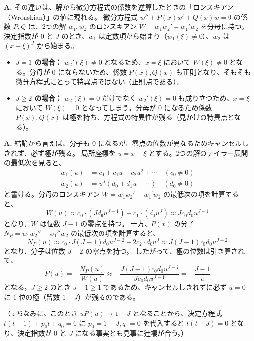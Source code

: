 \begin{Q}[【核心】$J=1$ と $J \ge 2$ では、どちらも「2つの解が正則」になるのに、なぜ $J=1$ は「正則点」で、$J \ge 2$ は「見かけの特異点」になるのか？]
\textbf{A.} その違いは、解から微分方程式の係数を逆算したときの「ロンスキアン（Wronskian）」の値に現れる。
微分方程式 $w'' + P(x)w' + Q(x)w = 0$ の係数 $P, Q$ は、2つの解 $w_{1}, w_{2}$ のロンスキアン $W = w_{1}w_{2}' - w_{1}'w_{2}$ を分母に持つ。
決定指数が $0$ と $J$ のとき、$w_{1}$ は定数項から始まり（$w_{1}(\xi) \neq 0$）、$w_{2}$ は $(x-\xi)^{J}$ から始まる。
\begin{itemize}
    \item \textbf{$J=1$ の場合：} $w_{2}'(\xi) \neq 0$ となるため、$x=\xi$ において $W(\xi) \neq 0$ となる。分母が $0$ にならないため、係数 $P(x), Q(x)$ も正則となり、そもそも微分方程式にとって特異点ではない（正則点である）。
    \item \textbf{$J \ge 2$ の場合：} $w_{2}(\xi) = 0$ だけでなく $w_{2}'(\xi) = 0$ も成り立つため、$x=\xi$ において $W(\xi) = 0$ となってしまう。分母が $0$ になるため係数 $P(x), Q(x)$ は極を持ち、方程式の特異性が残る（見かけの特異点となる）。
\end{itemize}
\end{Q}

\begin{Q}[【核心】$W(\xi)=0$ になるとしても、$P(x) = -\frac{w_{1}w_{2}'' - w_{1}''w_{2}}{W}$ の分子も同時に $0$ になって、極がキャンセルされる（除去可能な特異点になる）可能性はないのか？]
\textbf{A.} 結論から言えば、分子も $0$ になるが、零点の位数が異なるためキャンセルしきれず、必ず極が残る。
局所座標を $u = x-\xi$ とする。2つの解のテイラー展開の最低次を見ると、
\begin{align*}
w_{1}(u) &= c_{0} + c_{1}u + c_{2}u^{2} + \cdots \quad (c_{0} \neq 0) \\
w_{2}(u) &= u^{J}(d_{0} + d_{1}u + \cdots) \quad (d_{0} \neq 0)
\end{align*}
と書ける。分母のロンスキアン $W = w_{1}w_{2}' - w_{1}'w_{2}$ の最低次の項を計算すると、
\[
W(u) \approx c_{0} \cdot (J d_{0} u^{J-1}) - c_{1} \cdot (d_{0} u^{J}) \approx J c_{0} d_{0} u^{J-1}
\]
となり、$W$ は位数 $J-1$ の零点を持つ。
一方、$P(x)$ の分子 $N_{P} = w_{1}w_{2}'' - w_{1}''w_{2}$ の最低次の項を計算すると、
\[
N_{P}(u) \approx c_{0} \cdot J(J-1)d_{0}u^{J-2} - 2c_{2} \cdot d_{0}u^{J} \approx J(J-1)c_{0}d_{0}u^{J-2}
\]
となり、分子は位数 $J-2$ の零点を持つ。
したがって、極の位数は引き算されて、
\[
P(u) = -\frac{N_{P}(u)}{W(u)} \approx -\frac{J(J-1)c_{0}d_{0}u^{J-2}}{J c_{0} d_{0} u^{J-1}} = -\frac{J-1}{u}
\]
となる。$J \ge 2$ のとき $J-1 \ge 1$ であるため、キャンセルしきれずに必ず $u=0$ に $1$ 位の極（留数 $1-J$）が残るのである。

（※ちなみに、このとき $u P(u) \to 1-J$ となることから、決定方程式 $t(t-1) + p_{0}t + q_{0} = 0$ に $p_{0} = 1-J, q_{0} = 0$ を代入すると $t(t-J) = 0$ となり、決定指数が $0$ と $J$ になる事実とも見事に辻褄が合う。）
\end{Q}

